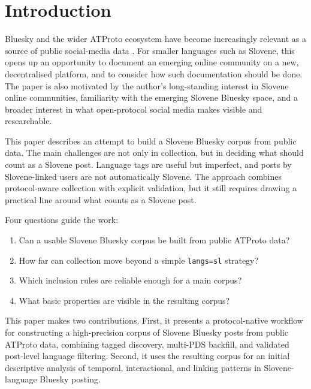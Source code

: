 \section{Introduction}

Bluesky and the wider ATProto ecosystem have become increasingly relevant as a source of public social-media data \parencite{failla2024bluesky,quelle2025bluesky}. For smaller languages such as Slovene, this opens up an opportunity to document an emerging online community on a new, decentralised platform, and to consider how such documentation should be done. The paper is also motivated by the author's long-standing interest in Slovene online communities, familiarity with the emerging Slovene Bluesky space, and a broader interest in what open-protocol social media makes visible and researchable.

This paper describes an attempt to build a Slovene Bluesky corpus from public data. The main challenges are not only in collection, but in deciding what should count as a Slovene post. Language tags are useful but imperfect, and posts by Slovene-linked users are not automatically Slovene. The approach combines protocol-aware collection with explicit validation, but it still requires drawing a practical line around what counts as a Slovene post.

Four questions guide the work:
\begin{enumerate}[noitemsep,topsep=2pt,partopsep=0pt]
  \item Can a usable Slovene Bluesky corpus be built from public ATProto data?
  \item How far can collection move beyond a simple \texttt{langs=sl} strategy?
  \item Which inclusion rules are reliable enough for a main corpus?
  \item What basic properties are visible in the resulting corpus?
\end{enumerate}

This paper makes two contributions. First, it presents a protocol-native workflow for constructing a high-precision corpus of Slovene Bluesky posts from public ATProto data, combining tagged discovery, multi-PDS backfill, and validated post-level language filtering. Second, it uses the resulting corpus for an initial descriptive analysis of temporal, interactional, and linking patterns in Slovene-language Bluesky posting.
